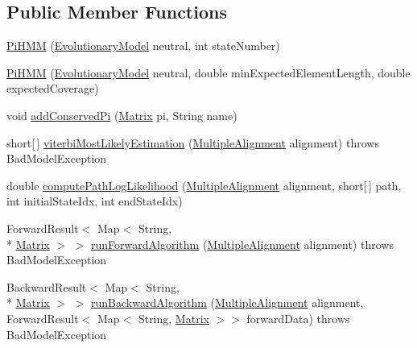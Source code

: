 \subsection*{Public Member Functions}
\begin{DoxyCompactItemize}
\item 
\hyperlink{classbroad_1_1core_1_1siphy_1_1_pi_h_m_m_a0d7f4e030eff34eb444086d26d62271f}{Pi\+H\+M\+M} (\hyperlink{classbroad_1_1core_1_1siphy_1_1_evolutionary_model}{Evolutionary\+Model} neutral, int state\+Number)
\item 
\hyperlink{classbroad_1_1core_1_1siphy_1_1_pi_h_m_m_a5cb4c8cce6c765d82c22a66fc06ec5d3}{Pi\+H\+M\+M} (\hyperlink{classbroad_1_1core_1_1siphy_1_1_evolutionary_model}{Evolutionary\+Model} neutral, double min\+Expected\+Element\+Length, double expected\+Coverage)
\item 
void \hyperlink{classbroad_1_1core_1_1siphy_1_1_pi_h_m_m_a5b91c9ce7ac53702af1c7a5912481a6b}{add\+Conserved\+Pi} (\hyperlink{class_jama_1_1_matrix}{Matrix} pi, String name)
\item 
short\mbox{[}$\,$\mbox{]} \hyperlink{classbroad_1_1core_1_1siphy_1_1_pi_h_m_m_a4333f5888bfa8018a9f129ef1cb6a4ae}{viterbi\+Most\+Likely\+Estimation} (\hyperlink{classbroad_1_1core_1_1multiplealignment_1_1_multiple_alignment}{Multiple\+Alignment} alignment)  throws Bad\+Model\+Exception 
\item 
double \hyperlink{classbroad_1_1core_1_1siphy_1_1_pi_h_m_m_a5ca38442b44e90860d8af48fc0aefe7f}{compute\+Path\+Log\+Likelihood} (\hyperlink{classbroad_1_1core_1_1multiplealignment_1_1_multiple_alignment}{Multiple\+Alignment} alignment, short\mbox{[}$\,$\mbox{]} path, int initial\+State\+Idx, int end\+State\+Idx)
\item 
Forward\+Result$<$ Map$<$ String, \\*
\hyperlink{class_jama_1_1_matrix}{Matrix} $>$ $>$ \hyperlink{classbroad_1_1core_1_1siphy_1_1_pi_h_m_m_a1c512f78e94940d91d8cf2356577742b}{run\+Forward\+Algorithm} (\hyperlink{classbroad_1_1core_1_1multiplealignment_1_1_multiple_alignment}{Multiple\+Alignment} alignment)  throws Bad\+Model\+Exception 
\item 
Backward\+Result$<$ Map$<$ String, \\*
\hyperlink{class_jama_1_1_matrix}{Matrix} $>$ $>$ \hyperlink{classbroad_1_1core_1_1siphy_1_1_pi_h_m_m_a6260c8c74ff9abfe162d5ba3b011b2c1}{run\+Backward\+Algorithm} (\hyperlink{classbroad_1_1core_1_1multiplealignment_1_1_multiple_alignment}{Multiple\+Alignment} alignment, Forward\+Result$<$ Map$<$ String, \hyperlink{class_jama_1_1_matrix}{Matrix} $>$$>$ forward\+Data)  throws Bad\+Model\+Exception 
\end{DoxyCompactItemize}
